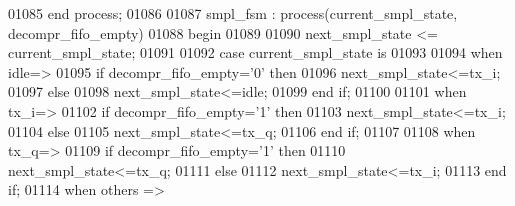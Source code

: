 \begin{DoxyCode}
01085 \textcolor{keywordflow}{end} \textcolor{keywordflow}{process};
01086 
01087 smpl\_fsm : \textcolor{keywordflow}{process}(current_smpl_state, decompr_fifo_empty)
01088 \textcolor{vhdlkeyword}{begin}
01089   
01090     \textcolor{vhdlchar}{next_smpl_state} \textcolor{vhdlchar}{<=} \textcolor{vhdlchar}{current_smpl_state};
01091     
01092     \textcolor{keywordflow}{case} \textcolor{vhdlchar}{current_smpl_state} \textcolor{keywordflow}{is}
01093 
01094       \textcolor{keywordflow}{when} \textcolor{vhdlchar}{idle}\textcolor{vhdlchar}{=}\textcolor{vhdlchar}{>}
01095        \textcolor{keywordflow}{if} \textcolor{vhdlchar}{decompr_fifo_empty}\textcolor{vhdlchar}{=}\textcolor{vhdlchar}{'}\textcolor{vhdllogic}{}\textcolor{vhdllogic}{0}\textcolor{vhdlchar}{'} \textcolor{keywordflow}{then}
01096           \textcolor{vhdlchar}{next_smpl_state}\textcolor{vhdlchar}{<=}\textcolor{vhdlchar}{tx\_i};
01097       \textcolor{keywordflow}{else}
01098           \textcolor{vhdlchar}{next_smpl_state}\textcolor{vhdlchar}{<=}\textcolor{vhdlchar}{idle};
01099       \textcolor{keywordflow}{end} \textcolor{keywordflow}{if}; 
01100    
01101       \textcolor{keywordflow}{when} \textcolor{vhdlchar}{tx\_i}\textcolor{vhdlchar}{=}\textcolor{vhdlchar}{>} 
01102           \textcolor{keywordflow}{if} \textcolor{vhdlchar}{decompr_fifo_empty}\textcolor{vhdlchar}{=}\textcolor{vhdlchar}{'}\textcolor{vhdllogic}{}\textcolor{vhdllogic}{1}\textcolor{vhdlchar}{'} \textcolor{keywordflow}{then}
01103               \textcolor{vhdlchar}{next_smpl_state}\textcolor{vhdlchar}{<=}\textcolor{vhdlchar}{tx\_i};           
01104           \textcolor{keywordflow}{else}
01105               \textcolor{vhdlchar}{next_smpl_state}\textcolor{vhdlchar}{<=}\textcolor{vhdlchar}{tx\_q};
01106           \textcolor{keywordflow}{end} \textcolor{keywordflow}{if};
01107           
01108       \textcolor{keywordflow}{when} \textcolor{vhdlchar}{tx\_q}\textcolor{vhdlchar}{=}\textcolor{vhdlchar}{>} 
01109           \textcolor{keywordflow}{if} \textcolor{vhdlchar}{decompr_fifo_empty}\textcolor{vhdlchar}{=}\textcolor{vhdlchar}{'}\textcolor{vhdllogic}{}\textcolor{vhdllogic}{1}\textcolor{vhdlchar}{'} \textcolor{keywordflow}{then}
01110               \textcolor{vhdlchar}{next_smpl_state}\textcolor{vhdlchar}{<=}\textcolor{vhdlchar}{tx\_q};
01111           \textcolor{keywordflow}{else}
01112               \textcolor{vhdlchar}{next_smpl_state}\textcolor{vhdlchar}{<=}\textcolor{vhdlchar}{tx\_i};
01113           \textcolor{keywordflow}{end} \textcolor{keywordflow}{if};  
01114       \textcolor{keywordflow}{when} \textcolor{keywordflow}{others} \textcolor{vhdlchar}{=}\textcolor{vhdlchar}{>} 

\end{DoxyCode}
